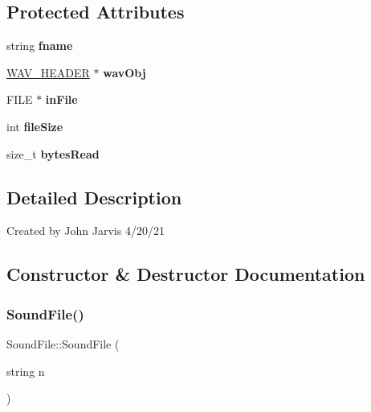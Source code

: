 \subsection*{Protected Attributes}
\begin{DoxyCompactItemize}
\item 
\mbox{\label{classSoundFile_ac34b46bf2c239d2648306a965bacb264}} 
string {\bfseries fname}
\item 
\mbox{\label{classSoundFile_aea1d25c118ce931996eaf4c1bdbf8856}} 
\hyperlink{structWAV__HEADER}{W\+A\+V\+\_\+\+H\+E\+A\+D\+ER} $\ast$ {\bfseries wav\+Obj}
\item 
\mbox{\label{classSoundFile_a5a4ae3b5a9f6d5e74a5049a8597ac260}} 
F\+I\+LE $\ast$ {\bfseries in\+File}
\item 
\mbox{\label{classSoundFile_af79618b6e627b20b3c948d054156f4a4}} 
int {\bfseries file\+Size}
\item 
\mbox{\label{classSoundFile_a2b0a6c8abf5161292caf408efcc659d9}} 
size\+\_\+t {\bfseries bytes\+Read}
\end{DoxyCompactItemize}


\subsection{Detailed Description}
Created by John Jarvis 4/20/21 

\subsection{Constructor \& Destructor Documentation}
\mbox{\label{classSoundFile_ad51984b0112e70cae3158b17ab2e3466}} 
\subsubsection{\texorpdfstring{Sound\+File()}{SoundFile()}\hspace{0.1cm}{\footnotesize\ttfamily [1/2]}}
{\footnotesize\ttfamily Sound\+File\+::\+Sound\+File (\begin{DoxyParamCaption}\item[{string}]{n }\end{DoxyParamCaption})}

